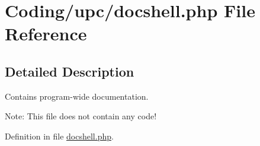 \hypertarget{docshell_8php}{
\section{Coding/upc/docshell.php File Reference}
\label{docshell_8php}
}


\subsection{Detailed Description}
Contains program-wide documentation. \begin{Desc}
\item[Note:]This file does not contain any code! \end{Desc}


Definition in file \hyperlink{docshell_8php-source}{docshell.php}.